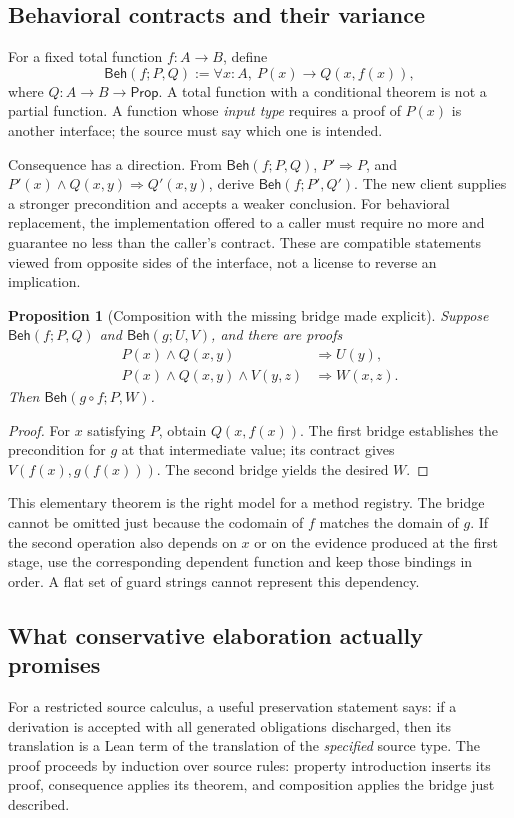 \documentclass[11pt,letterpaper]{article}
\newcommand{\Beh}{\mathsf{Beh}}
\newtheorem{proposition}{Proposition}[section]
\theoremstyle{definition}\newtheorem{definition}[proposition]{Definition}
\theoremstyle{remark}\newtheorem{remark}[proposition]{Remark}
\begin{document}
\subsection{Behavioral contracts and their variance}
For a fixed total function $f:A\to B$, define
\[
 \Beh(f;P,Q):=\forall x:A,\ P(x)\to Q(x,f(x)),
\]
where $Q:A\to B\to\mathsf{Prop}$. A total function with a conditional theorem
is not a partial function. A function whose \emph{input type} requires a proof
of $P(x)$ is another interface; the source must say which one is intended.

Consequence has a direction. From $\Beh(f;P,Q)$, $P'\Rightarrow P$, and
$P'(x)\wedge Q(x,y)\Rightarrow Q'(x,y)$, derive $\Beh(f;P',Q')$.
The new client supplies a stronger precondition and accepts a weaker conclusion.
For behavioral replacement, the implementation offered to a caller must require
no more and guarantee no less than the caller's contract. These are compatible
statements viewed from opposite sides of the interface, not a license to reverse
an implication.

\begin{proposition}[Composition with the missing bridge made explicit]
Suppose $\Beh(f;P,Q)$ and $\Beh(g;U,V)$, and there are proofs
\begin{align*}
 P(x)\wedge Q(x,y)&\Longrightarrow U(y),\\
 P(x)\wedge Q(x,y)\wedge V(y,z)&\Longrightarrow W(x,z).
\end{align*}
Then $\Beh(g\circ f;P,W)$.
\end{proposition}
\begin{proof}
For $x$ satisfying $P$, obtain $Q(x,f(x))$. The first bridge establishes the
precondition for $g$ at that intermediate value; its contract gives
$V(f(x),g(f(x)))$. The second bridge yields the desired $W$.
\end{proof}

This elementary theorem is the right model for a method registry. The bridge
cannot be omitted just because the codomain of $f$ matches the domain of $g$.
If the second operation also depends on $x$ or on the evidence produced at the
first stage, use the corresponding dependent function and keep those bindings
in order. A flat set of guard strings cannot represent this dependency.

\subsection{What conservative elaboration actually promises}
For a restricted source calculus, a useful preservation statement says:
if a derivation is accepted with all generated obligations discharged, then its
translation is a Lean term of the translation of the \emph{specified} source
type. The proof proceeds by induction over source rules: property introduction
inserts its proof, consequence applies its theorem, and composition applies the
bridge just described.
\end{document}
